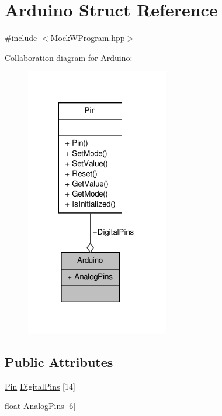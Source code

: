 \hypertarget{struct_arduino}{\section{Arduino Struct Reference}
\label{struct_arduino}
}


{\ttfamily \#include $<$Mock\-W\-Program.\-hpp$>$}



Collaboration diagram for Arduino\-:\nopagebreak
\begin{figure}[H]
\begin{center}
\leavevmode
\includegraphics[width=177pt]{struct_arduino__coll__graph}
\end{center}
\end{figure}
\subsection*{Public Attributes}
\begin{DoxyCompactItemize}
\item 
\hyperlink{class_pin}{Pin} \hyperlink{struct_arduino_ae607ad57ed2b574c1db0e298d1700154}{Digital\-Pins} \mbox{[}14\mbox{]}
\item 
float \hyperlink{struct_arduino_a344478f98fe14a78faa30bb694d7b28d}{Analog\-Pins} \mbox{[}6\mbox{]}
\end{DoxyCompactItemize}


